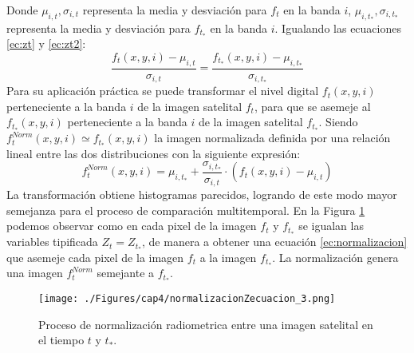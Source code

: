 Donde $ \mu_{i,t},\sigma_{i,t} $ representa la media y desviaci\'on para $ f_{t} $ en la banda $ i $, $ \mu_{i,t_{*}},\sigma_{i,t_{*}} $ representa la media y desviaci\'on para $ f_{t_{*}} $ en la banda $ i $. Igualando las ecuaciones \ref{ec:zt} y \ref{ec:zt2}:
\begin{equation}
\dfrac{f_{t}(x,y,i)-\mu_{i,t}}{\sigma_{i,t}}=\dfrac{f_{t_{*}}(x,y,i)-\mu_{i,t_{*}}}{\sigma_{i,t_{*}}}
\end{equation}
Para su aplicaci\'on pr\'actica se puede transformar el nivel digital $ f_{t}(x,y,i) $ perteneciente a la banda $ i $ de la imagen satelital $ f_{t} $, para que se asemeje al $ f_{t_{*}}(x,y,i) $ perteneciente a la banda $ i $ de la imagen satelital $ f_{t_{*}} $. Siendo $ f_{t}^{Norm}(x,y,i) \simeq  f_{t_{*}}(x,y,i)$ la imagen normalizada definida por una relaci\'on lineal entre las dos distribuciones con la siguiente expresi\'on:
\begin{equation}\label{ec:normalizacion}
f_{t}^{Norm}(x,y,i)=\mu_{i,t_{*}}+\dfrac{\sigma_{i,t_*}}{\sigma_{i,t}}\cdot(f_{t}(x,y,i)-\mu_{i,t})
\end{equation}
La transformaci\'on obtiene histogramas parecidos, logrando de este modo mayor semejanza para el proceso de comparaci\'on multitemporal. En la Figura \ref{fig:normProceso} podemos observar como en cada pixel de la imagen $ f_{t} $ y $ f_{t_{*}} $ se igualan las variables tipificada $ Z_{t} = Z_{t_{*}} $, de manera a obtener una ecuaci\'on \ref{ec:normalizacion} que asemeje cada pixel de la imagen $ f_{t} $ a la imagen $ f_{t_{*}} $. La normalizaci\'on genera una imagen $ f_{t}^{Norm} $ semejante a $ f_{t_{*}} $.
\begin{figure}[H]
	\centering
	\texttt{[image: ./Figures/cap4/normalizacionZecuacion\_3.png]}
	\caption{Proceso de normalizaci\'on radiometrica entre una imagen satelital en el tiempo $ t $ y $ t_* $.}
	\label{fig:normProceso}
\end{figure}

